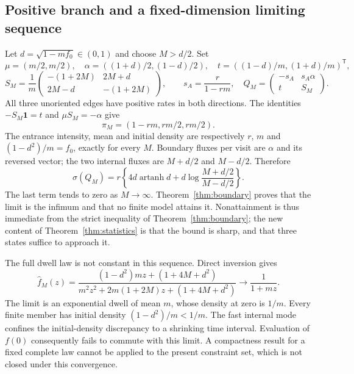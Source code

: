 \documentclass[11pt,a4paper]{article}
\theoremstyle{remark}\newtheorem{remark}[theorem]{Remark}
\newcommand{\one}{\mathbf 1}
\newcommand{\atanh}{\operatorname{artanh}}
\begin{document}
\subsection{Positive branch and a fixed-dimension limiting sequence}

Let $d=\sqrt{1-mf_0}\in(0,1)$ and choose $M>d/2$. Set
\begin{equation}\label{eq:sharpvectors}
 \mu=(m/2,m/2),\quad
 \alpha=((1+d)/2,(1-d)/2),\quad
 t=((1-d)/m,(1+d)/m)^{\mathsf T},
\end{equation}
\begin{equation}\label{eq:fastmatrix}
 S_M=\frac1m
 \begin{pmatrix}-(1+2M)&2M+d\\2M-d&-(1+2M)\end{pmatrix},\qquad
 s_A=\frac r{1-rm},\quad
 Q_M=\begin{pmatrix}-s_A&s_A\alpha\\t&S_M\end{pmatrix}.
\end{equation}
All three unoriented edges have positive rates in both directions.
The identities $-S_M\one=t$ and $\mu S_M=-\alpha$ give
\begin{equation}
 \pi_M=(1-rm,rm/2,rm/2).
\end{equation}
The entrance intensity, mean and initial density are respectively
$r$, $m$ and $(1-d^2)/m=f_0$, exactly for every $M$.
Boundary fluxes per visit are $\alpha$ and its reversed vector; the two
internal fluxes are $M+d/2$ and $M-d/2$. Therefore
\begin{equation}\label{eq:fastcost}
 \sigma(Q_M)=r\left\{4d\atanh d+
             d\log\frac{M+d/2}{M-d/2}\right\}.
\end{equation}
The last term tends to zero as $M\to\infty$. Theorem~\ref{thm:boundary}
proves that the limit is the infimum and that no finite model attains it.
Nonattainment is thus immediate from the strict inequality of
Theorem~\ref{thm:boundary}; the new content of Theorem~\ref{thm:statistics}
is that the bound is sharp, and that three states suffice to approach it.


The full dwell law is not constant in this sequence. Direct inversion gives
\begin{equation}\label{eq:fasttransform}
 \widehat f_M(z)=
 \frac{(1-d^2)mz+(1+4M+d^2)}
      {m^2z^2+2m(1+2M)z+(1+4M+d^2)}
 \longrightarrow\frac1{1+mz}.
\end{equation}
The limit is an exponential dwell of mean $m$, whose density at zero is
$1/m$. Every finite member has initial density $(1-d^2)/m<1/m$.
The fast internal mode confines the initial-density discrepancy to a
shrinking time interval. Evaluation of $f(0)$ consequently fails to commute
with this limit. A compactness result for a fixed complete law cannot be
applied to the present constraint set, which is not closed under this
convergence.
\end{document}
